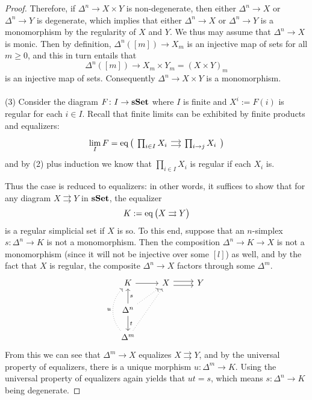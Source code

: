 \documentclass[a4paper,11pt,openany]{scrartcl}
\begin{document}
\begin{proof}
Therefore, if $\Delta^n\to X\times Y$ is non-degenerate, then either $\Delta^n\to X$ or $\Delta^n\to Y$ is degenerate, which implies that either $\Delta^n\to X$ or $\Delta^n\to Y$ is a monomorphism by the regularity of $X$ and $Y$. We thus may assume that $\Delta^n\to X$ is monic. Then by definition, $\Delta^n([m])\to X_m$ is an injective map of sets for all $m\geqslant 0$, and this in turn entails that
\[
\Delta^n([m])\to X_m\times Y_m=(X\times Y)_m
\]
is an injective map of sets. Consequently $\Delta^n\to X\times Y$ is a monomorphism.\\
\\
(3) Consider the diagram $F\colon I\to\operatorname{\mathbf{sSet}}$ where $I$ is finite and $X^i:=F(i)$ is regular for each $i\in I$. Recall that finite limits can be exhibited by finite products and equalizers:
\[
\lim_IF=\eq\big(
\begin{tikzcd}[sep=small]
\prod_{i\in I}X_i\arrow[r,shift right]\arrow[r,shift left]&\prod_{i\to j}X_i
\end{tikzcd}\big)
\]
and by (2) plus induction we know that $\prod_{i\in I}X_i$ is regular if each $X_i$ is. 

Thus the case is reduced to equalizers: in other words, it suffices to show that for any diagram $X\rightrightarrows Y$ in $\operatorname{\mathbf{sSet}}$, the equalizer
\[
K:=\operatorname{eq}\big(X\rightrightarrows Y\big)
\]
is a regular simplicial set if $X$ is so. To this end, suppose that an $n$-simplex $s\colon\Delta^n\to K$ is not a monomorphism. Then the composition $\Delta^n\to K\to X$ is not a monomorphism (since it will not be injective over some $[l]$) as well, and by the fact that $X$ is regular, the composite $\Delta^n\to X$ factors through some $\Delta^m$.
\[
\begin{tikzcd}
K\arrow[r]& X\arrow[r,shift right]\arrow[r,shift left]& Y\\
\Delta^n\arrow[u,"s"']\arrow[ur,dotted]\arrow[d,"t"]&&\\
\Delta^m\arrow[uur,dotted]\arrow[uu,bend left=45,dotted,"u"]&&
\end{tikzcd}
\]
From this we can see that $\Delta^m\to X$ equalizes $X\rightrightarrows Y$, and by the universal property of equalizers, there is a unique morphism $u\colon\Delta^m\to K$. Using the universal property of equalizers again yields that $ut=s$, which means $s\colon\Delta^n\to K$ being degenerate.
\end{proof}
\end{document}
